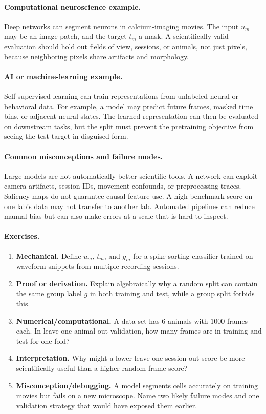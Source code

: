 \paragraph{Computational neuroscience example.}
Deep networks can segment neurons in calcium-imaging movies. The input \(u_m\) may be an image patch, and the target \(t_m\) a mask. A scientifically valid evaluation should hold out fields of view, sessions, or animals, not just pixels, because neighboring pixels share artifacts and morphology.

\paragraph{AI or machine-learning example.}
Self-supervised learning can train representations from unlabeled neural or behavioral data. For example, a model may predict future frames, masked time bins, or adjacent neural states. The learned representation can then be evaluated on downstream tasks, but the split must prevent the pretraining objective from seeing the test target in disguised form.

\paragraph{Common misconceptions and failure modes.}
Large models are not automatically better scientific tools. A network can exploit camera artifacts, session IDs, movement confounds, or preprocessing traces. Saliency maps do not guarantee causal feature use. A high benchmark score on one lab's data may not transfer to another lab. Automated pipelines can reduce manual bias but can also make errors at a scale that is hard to inspect.

\paragraph{Exercises.}
\begin{enumerate}[label=\textbf{52.3.\arabic*.}, leftmargin=*]
\item \textbf{Mechanical.} Define \(u_m\), \(t_m\), and \(g_m\) for a spike-sorting classifier trained on waveform snippets from multiple recording sessions.
\item \textbf{Proof or derivation.} Explain algebraically why a random split can contain the same group label \(g\) in both training and test, while a group split forbids this.
\item \textbf{Numerical/computational.} A data set has \(6\) animals with \(1000\) frames each. In leave-one-animal-out validation, how many frames are in training and test for one fold?
\item \textbf{Interpretation.} Why might a lower leave-one-session-out score be more scientifically useful than a higher random-frame score?
\item \textbf{Misconception/debugging.} A model segments cells accurately on training movies but fails on a new microscope. Name two likely failure modes and one validation strategy that would have exposed them earlier.
\end{enumerate}

